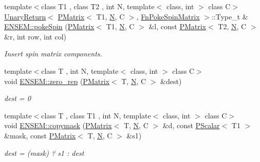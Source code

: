 \begin{DoxyCompactItemize}
\item 
{\footnotesize template$<$class T1 , class T2 , int N, template$<$ class, int $>$ class C$>$ }\\\mbox{\hyperlink{structENSEM_1_1UnaryReturn}{Unary\+Return}}$<$ \mbox{\hyperlink{classENSEM_1_1PMatrix}{P\+Matrix}}$<$ T1, \mbox{\hyperlink{adat__devel_2lib_2hadron_2operator__name__util_8cc_a7722c8ecbb62d99aee7ce68b1752f337}{N}}, C $>$, \mbox{\hyperlink{structENSEM_1_1FnPokeSpinMatrix}{Fn\+Poke\+Spin\+Matrix}} $>$\+::Type\+\_\+t \& \mbox{\hyperlink{group__primmatrix_gaf6f04aa80d2490f962a3132eb16fa98a}{E\+N\+S\+E\+M\+::poke\+Spin}} (\mbox{\hyperlink{classENSEM_1_1PMatrix}{P\+Matrix}}$<$ T1, \mbox{\hyperlink{adat__devel_2lib_2hadron_2operator__name__util_8cc_a7722c8ecbb62d99aee7ce68b1752f337}{N}}, C $>$ \&l, const \mbox{\hyperlink{classENSEM_1_1PMatrix}{P\+Matrix}}$<$ T2, \mbox{\hyperlink{adat__devel_2lib_2hadron_2operator__name__util_8cc_a7722c8ecbb62d99aee7ce68b1752f337}{N}}, C $>$ \&r, int row, int col)
\begin{DoxyCompactList}\small\item\em Insert spin matrix components. \end{DoxyCompactList}\item 
{\footnotesize template$<$class T , int N, template$<$ class, int $>$ class C$>$ }\\void \mbox{\hyperlink{group__primmatrix_gab1edf71028dd684730e061dcc75b5b83}{E\+N\+S\+E\+M\+::zero\+\_\+rep}} (\mbox{\hyperlink{classENSEM_1_1PMatrix}{P\+Matrix}}$<$ T, \mbox{\hyperlink{adat__devel_2lib_2hadron_2operator__name__util_8cc_a7722c8ecbb62d99aee7ce68b1752f337}{N}}, C $>$ \&dest)
\begin{DoxyCompactList}\small\item\em dest = 0 \end{DoxyCompactList}\item 
{\footnotesize template$<$class T , class T1 , int N, template$<$ class, int $>$ class C$>$ }\\void \mbox{\hyperlink{group__primmatrix_ga6bebd0377eb8253b3d4ba1586d1ecdad}{E\+N\+S\+E\+M\+::copymask}} (\mbox{\hyperlink{classENSEM_1_1PMatrix}{P\+Matrix}}$<$ T, \mbox{\hyperlink{adat__devel_2lib_2hadron_2operator__name__util_8cc_a7722c8ecbb62d99aee7ce68b1752f337}{N}}, C $>$ \&d, const \mbox{\hyperlink{classENSEM_1_1PScalar}{P\+Scalar}}$<$ T1 $>$ \&mask, const \mbox{\hyperlink{classENSEM_1_1PMatrix}{P\+Matrix}}$<$ T, \mbox{\hyperlink{adat__devel_2lib_2hadron_2operator__name__util_8cc_a7722c8ecbb62d99aee7ce68b1752f337}{N}}, C $>$ \&s1)
\begin{DoxyCompactList}\small\item\em dest = (mask) ? s1 \+: dest \end{DoxyCompactList}\item 

\end{DoxyCompactItemize}
